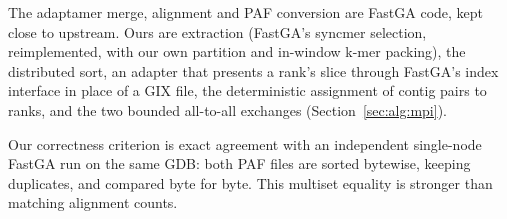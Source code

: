 The adaptamer merge, alignment and PAF conversion are FastGA code, kept
close to upstream. Ours are extraction (FastGA's syncmer selection,
reimplemented, with our own partition and in-window k-mer packing), the
distributed sort, an adapter that presents a
rank's slice through FastGA's index interface in place of a GIX file, the
deterministic assignment of contig pairs to ranks, and the two bounded
all-to-all exchanges (Section~\ref{sec:alg:mpi}).

Our correctness criterion is exact agreement with an independent
single-node FastGA run on the same GDB: both PAF files are sorted
bytewise, keeping duplicates, and compared byte for byte. This multiset
equality is stronger than matching alignment counts.
